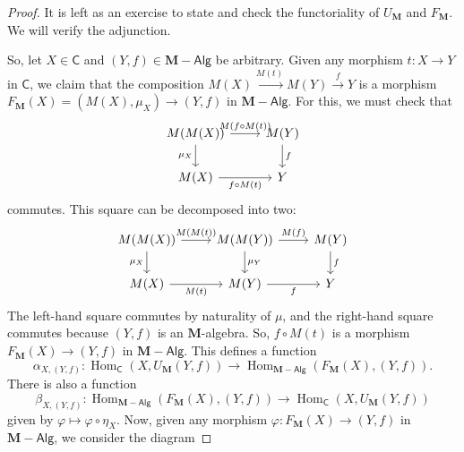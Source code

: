 \documentclass{article}
\theoremstyle{definition}
\newcommand{\C}{\mathsf{C}}
\newcommand{\M}{\mathbf{M}}
\newcommand{\Alg}{\mathsf{Alg}}
\DeclareMathOperator{\Hom}{Hom}
\begin{document}
\begin{proof}
    It is left as an exercise to state and check the functoriality of $U_{\M}$ and $F_{\M}$. We will verify the adjunction.
    
    So, let $X \in \C$ and $(Y,f) \in \M{-}\Alg$ be arbitrary. Given any morphism $t : X \to Y$ in $\C$, we claim that the composition $M(X) \xrightarrow{M(t)} M(Y) \xrightarrow{f} Y$ is a morphism $F_{\M}(X) = (M(X),\mu_X) \to (Y,f)$ in $\M{-}\Alg$. For this, we must check that
    \[\begin{tikzcd}[ampersand replacement=\&]
    	{M(M(X))} \& {M(Y)} \\
    	{M(X)} \& Y
    	\arrow["{M(f \circ M(t))}", from=1-1, to=1-2]
    	\arrow["{\mu_X}"', from=1-1, to=2-1]
    	\arrow["{f \circ M(t)}"', from=2-1, to=2-2]
    	\arrow["f", from=1-2, to=2-2]
    \end{tikzcd}\]
    commutes. This square can be decomposed into two:
    \[\begin{tikzcd}[ampersand replacement=\&]
    	{M(M(X))} \& {M(M(Y))} \& {M(Y)} \\
    	{M(X)} \& {M(Y)} \& Y
    	\arrow["{\mu_X}"', from=1-1, to=2-1]
    	\arrow["{M(M(t))}", from=1-1, to=1-2]
    	\arrow["{M(t)}"', from=2-1, to=2-2]
    	\arrow["{\mu_Y}", from=1-2, to=2-2]
    	\arrow["{M(f)}", from=1-2, to=1-3]
    	\arrow["f", from=1-3, to=2-3]
    	\arrow["f"', from=2-2, to=2-3]
    \end{tikzcd}\]
    The left-hand square commutes by naturality of $\mu$, and the right-hand square commutes because $(Y,f)$ is an $\M$-algebra. So, $f \circ M(t)$ is a morphism $F_{\M}(X) \to (Y,f)$ in $\M{-}\Alg$. This defines a function
    \[\alpha_{X,(Y,f)} : \Hom_{\C}(X,U_{\M}(Y,f)) \to \Hom_{\M{-}\Alg}(F_{\M}(X),(Y,f)).\]
    There is also a function
    \[\beta_{X,(Y,f)} : \Hom_{\M{-}\Alg}(F_{\M}(X),(Y,f)) \to \Hom_{\C}(X,U_{\M}(Y,f))\]
    given by $\varphi \mapsto \varphi \circ \eta_X$.
    Now, given any morphism $\varphi : F_{\M}(X) \to (Y,f)$ in $\M{-}\Alg$, we consider the diagram

\end{proof}
\end{document}
